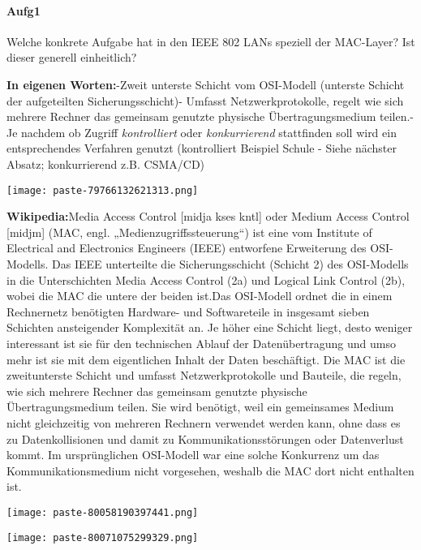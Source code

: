 \documentclass{article}
\begin{document}
\paragraph{Aufg1}
\begin{tcolorbox}[colback=white!10!white,colframe=lightgray!75!black,
  savelowerto=\jobname_ex.tex,breakable,enhanced,lines before break=40]

\justifying
Welche konkrete Aufgabe hat in den IEEE 802 LANs speziell der MAC-Layer? Ist dieser generell einheitlich?

\tcblower

\justifying
\textbf{In eigenen Worten:}-Zweit unterste Schicht vom OSI-Modell (unterste Schicht der aufgeteilten Sicherungsschicht)- Umfasst Netzwerkprotokolle, regelt wie sich mehrere Rechner das gemeinsam genutzte physische Übertragungsmedium teilen.- Je nachdem ob Zugriff \textit{kontrolliert }oder \textit{konkurrierend} stattfinden soll wird ein entsprechendes Verfahren genutzt (kontrolliert  Beispiel Schule - Siehe nächster Absatz; konkurrierend  z.B. CSMA/CD)\begin{center}
\texttt{[image: paste-79766132621313.png]}
\end{center}
\textbf{Wikipedia:}Media Access Control [midja kses kntl] oder Medium Access Control [midjm] (MAC, engl. „Medienzugriffssteuerung“) ist eine vom Institute of Electrical and Electronics Engineers (IEEE) entworfene Erweiterung des OSI-Modells. Das IEEE unterteilte die Sicherungsschicht (Schicht 2) des OSI-Modells in die Unterschichten Media Access Control (2a) und Logical Link Control (2b), wobei die MAC die untere der beiden ist.Das OSI-Modell ordnet die in einem Rechnernetz benötigten Hardware- und Softwareteile in insgesamt sieben Schichten ansteigender Komplexität an. Je höher eine Schicht liegt, desto weniger interessant ist sie für den technischen Ablauf der Datenübertragung und umso mehr ist sie mit dem eigentlichen Inhalt der Daten beschäftigt. Die MAC ist die zweitunterste Schicht und umfasst Netzwerkprotokolle und Bauteile, die regeln, wie sich mehrere Rechner das gemeinsam genutzte physische Übertragungsmedium teilen. Sie wird benötigt, weil ein gemeinsames Medium nicht gleichzeitig von mehreren Rechnern verwendet werden kann, ohne dass es zu Datenkollisionen und damit zu Kommunikationsstörungen oder Datenverlust kommt. Im ursprünglichen OSI-Modell war eine solche Konkurrenz um das Kommunikationsmedium nicht vorgesehen, weshalb die MAC dort nicht enthalten ist.\begin{center}
\texttt{[image: paste-80058190397441.png]}
\end{center}
\begin{center}
\texttt{[image: paste-80071075299329.png]}
\end{center}

\end{tcolorbox}
\end{document}
